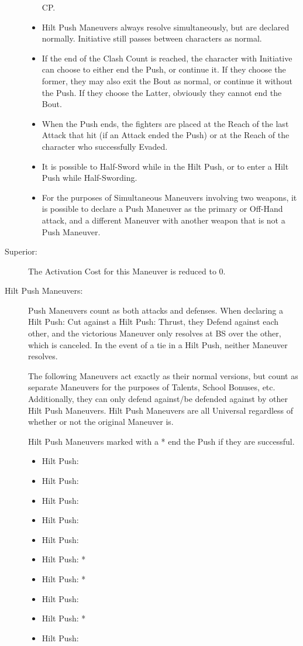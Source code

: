 \documentclass[oneside,11pt,english]{book}
\begin{document}
\begin{description}
\begin{itemize}
    CP.
  \item Hilt Push Maneuvers always resolve simultaneously, but are declared
    normally. Initiative still passes between characters as normal.
  \item If the end of the Clash Count is reached, the character with Initiative
    can choose to either end the Push, or continue it. If they choose the
    former, they may also exit the Bout as normal, or continue it without the
    Push. If they choose the Latter, obviously they cannot end the Bout.
  \item When the Push ends, the fighters are placed at the Reach of the last
    Attack that hit (if an Attack ended the Push) or at the Reach of the
    character who successfully Evaded. 
  \item It is possible to Half-Sword while in the Hilt Push, or to enter a Hilt
    Push while Half-Swording.
  \item For the purposes of Simultaneous Maneuvers involving two weapons, it is
    possible to declare a Push Maneuver as the primary or Off-Hand attack, and a
    different Maneuver with another weapon that is not a Push Maneuver.
  \end{itemize}
\item [Superior:] The Activation Cost for this Maneuver is reduced to 0. 
\item [Hilt Push Maneuvers:] Push Maneuvers count as both attacks and defenses.
  When declaring a Hilt Push: Cut against a Hilt Push: Thrust, they Defend
  against each other, and the victorious Maneuver only resolves at BS over the
  other, which is canceled. In the event of a tie in a Hilt Push, neither
  Maneuver resolves.

  The following Maneuvers act exactly as their normal versions, but count as
  separate Maneuvers for the purposes of Talents, School Bonuses, etc.
  Additionally, they can only defend against/be defended against by other Hilt
  Push Maneuvers. Hilt Push Maneuvers are all Universal regardless of whether or
  not the original Maneuver is. 

  Hilt Push Maneuvers marked with a * end the Push if they are successful. 
  \begin{itemize}
    [noitemsep]
  \item Hilt Push: 
  \item Hilt Push: 
  \item Hilt Push: 
  \item Hilt Push: 
  \item Hilt Push: 
  \item Hilt Push: *
  \item Hilt Push: *
  \item Hilt Push: 
  \item Hilt Push: *
  \item Hilt Push: 
  \end{itemize}
\end{description}
\end{document}
